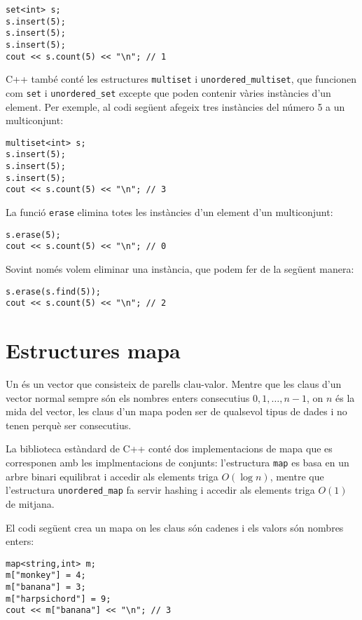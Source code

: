 \begin{lstlisting}
set<int> s;
s.insert(5);
s.insert(5);
s.insert(5);
cout << s.count(5) << "\n"; // 1
\end{lstlisting}

C++ també conté les estructures
\texttt{multiset} i \texttt{unordered\_multiset},
que funcionen com \texttt{set}
i \texttt{unordered\_set}
excepte que poden contenir vàries instàncies d'un element.
Per exemple, al codi següent afegeix tres instàncies
del número 5 a un multiconjunt:

\begin{lstlisting}
multiset<int> s;
s.insert(5);
s.insert(5);
s.insert(5);
cout << s.count(5) << "\n"; // 3
\end{lstlisting}
La funció \texttt{erase} elimina
totes les instàncies d'un element
d'un multiconjunt:
\begin{lstlisting}
s.erase(5);
cout << s.count(5) << "\n"; // 0
\end{lstlisting}
Sovint només volem eliminar una instància,
que podem fer de la següent manera:
\begin{lstlisting}
s.erase(s.find(5));
cout << s.count(5) << "\n"; // 2
\end{lstlisting}

\section{Estructures mapa}


Un  és un vector que consisteix
de parells clau-valor.
Mentre que les claus d'un vector normal sempre
són els nombres enters consecutius $0,1,\ldots,n-1$,
on $n$ és la mida del vector,
les claus d'un mapa poden ser de qualsevol tipus de dades i
no tenen perquè ser consecutius.

La biblioteca estàndard de C++ conté dos implementacions
de mapa que es corresponen amb les implmentacions de
conjunts: l'estructura
\texttt{map} es basa en un arbre binari
equilibrat i accedir als elements triga $O(\log n)$,
mentre que l'estructura
\texttt{unordered\_map} fa servir hashing
i accedir als elements triga $O(1)$ de mitjana.

El codi següent crea un mapa
on les claus són cadenes i els valors són nombres enters:

\begin{lstlisting}
map<string,int> m;
m["monkey"] = 4;
m["banana"] = 3;
m["harpsichord"] = 9;
cout << m["banana"] << "\n"; // 3
\end{lstlisting}

